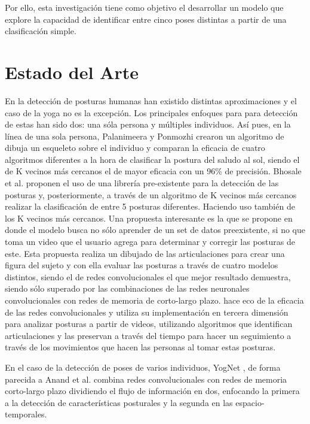 \documentclass[journal]{IEEEtran}
\begin{document}
Por ello, esta investigación tiene como objetivo el desarrollar un modelo que explore la capacidad de identificar entre cinco poses distintas a partir de una clasificación simple.

\section{Estado del Arte}
En la detección de posturas humanas han existido distintas aproximaciones y el caso de la yoga no es la excepción. Los principales enfoques para para detección de estas han sido dos: una sóla persona y múltiples individuos. 
Así pues, en la línea de una sola persona, Palanimeera y Ponmozhi \cite{palanimeera2021classification} crearon un algoritmo de dibuja un esqueleto sobre el individuo y comparan la eficacia de cuatro algoritmos diferentes a la hora de clasificar la postura del saludo al sol, siendo el de K vecinos más cercanos el de mayor eficacia con un 96\% de precisión. Bhosale et al. \cite{bhosale2022yoga} proponen el uso de una librería pre-existente para la detección de las posturas y, posteriormente, a través de un algoritmo de K vecinos más cercanos realizar la clasificación de entre 5 posturas diferentes. Haciendo uso también de los K vecinos más cercanos. Una propuesta interesante es la que se propone en \cite{anand2022yoga} donde el modelo busca no sólo aprender de un set de datos preexistente, si no que toma un video que el usuario agrega para determinar y corregir las posturas de este. Esta propuesta realiza un dibujado de las articulaciones para crear una figura del sujeto y con ella evaluar las posturas a través de cuatro modelos distintos, siendo el de redes convolucionales el que mejor resultado demuestra, siendo sólo superado por las combinaciones de las redes neuronales convolucionales con redes de memoria de corto-largo plazo. \cite{8666736} hace eco de la eficacia de las redes convolucionales y utiliza su implementación en tercera dimensión para analizar posturas a partir de videos, utilizando algoritmos que identifican articulaciones y las preservan a través del tiempo para hacer un seguimiento a través de los movimientos que hacen las personas al tomar estas posturas. 

En el caso de la detección de poses de varios individuos, YogNet \cite{yadav2022yognet}, de forma parecida a Anand et al. combina redes convolucionales con redes de memoria corto-largo plazo dividiendo el flujo de información en dos, enfocando la primera a la detección de características posturales y la segunda en las espacio-temporales. 
\end{document}
